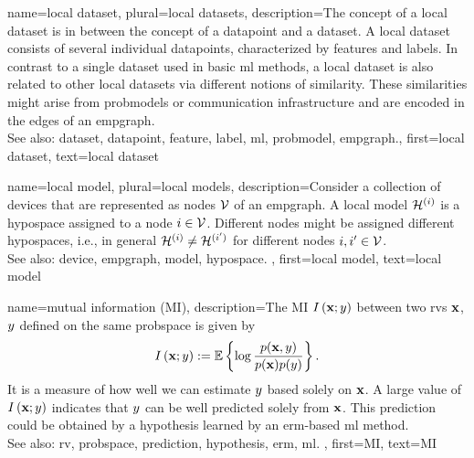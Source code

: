 	
{name={local dataset}, plural={local datasets}, 
	description={The concept of a local \gls{dataset} is 
		in between the concept of a \gls{datapoint} and a \gls{dataset}. A local \gls{dataset} consists of several 
		individual \glspl{datapoint}, characterized by \glspl{feature} and \glspl{label}. 
		In contrast to a single \gls{dataset} used in basic \gls{ml} methods, a local \gls{dataset} is also 
		related to other local \glspl{dataset} via different notions of similarity. These similarities 
		might arise from \glspl{probmodel} or communication infrastructure and 
		are encoded in the edges of an \gls{empgraph}.
				\\
		See also: \gls{dataset}, \gls{datapoint}, \gls{feature}, \gls{label}, \gls{ml}, \gls{probmodel}, \gls{empgraph}.},
		first={local dataset},
		text={local dataset}
}
	
{name={local model}, plural={local models}, 
	description={Consider a collection of \glspl{device} that are represented 
		as nodes $\mathcal{V}$ of an \gls{empgraph}. A local \gls{model} $\mathcal{H}^{(i)}$ 
		is a \gls{hypospace} assigned to a node $i \in \mathcal{V}$. Different nodes might be 
		assigned different \glspl{hypospace}, i.e., in general $\mathcal{H}^{(i)} \neq \mathcal{H}^{(i')}$ for different 
		nodes $i, i' \in \mathcal{V}$. 
				\\
		See also: \gls{device}, \gls{empgraph}, \gls{model}, \gls{hypospace}. },
	first={local model},
	text={local model}
}
	
{name={mutual information (MI)},
 	description={The MI $I \left( {\bf x};y\right)$ 
 		between two \glspl{rv} ${\bf x}$, $y$ defined on the same \gls{probspace} 
 		is given by \cite{coverthomas} $$I \left( {\bf x};y\right) := 
		\mathbb{E} \left\{ \log \frac{p ({\bf x},y)}{p({\bf x})p(y)} \right\}.$$ 
		It is a measure of how well we can estimate $y$ based 
		solely on ${\bf x}$. A large value of $I \left( {\bf x};y\right)$ indicates that 
		$y$ can be well predicted solely from ${\bf x}$. This \gls{prediction} could be obtained by a 
		\gls{hypothesis} learned by an \gls{erm}-based \gls{ml} method. 
				\\
		See also: \gls{rv}, \gls{probspace}, \gls{prediction}, \gls{hypothesis}, \gls{erm}, \gls{ml}. }, 
	first={MI}, 
	text={MI} 
}

